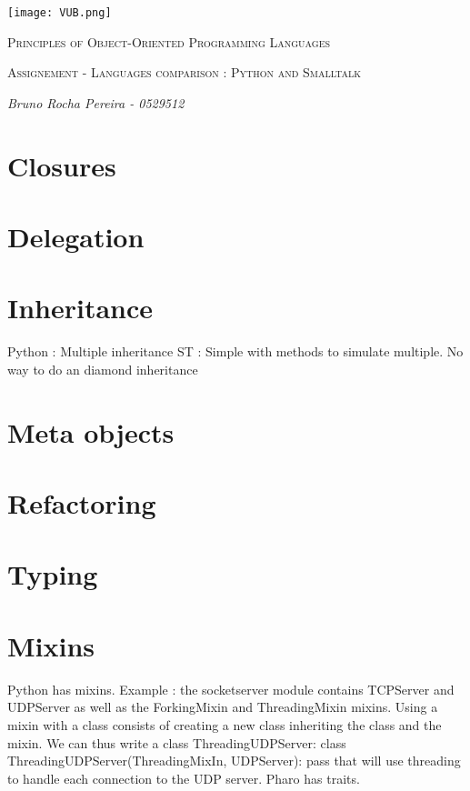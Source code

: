 \documentclass[12pt,a4paper,twocolumn]{scrartcl}
\begin{document}
\begin{titlepage}
    \centering
    \texttt{[image: VUB.png]}\par\vspace{1cm}
    {\scshape\Large Principles of Object-Oriented Programming Languages\par}
    \vspace{1cm}
    {\scshape\Large Assignement - Languages comparison : Python and Smalltalk\par}
    \vspace{1.5cm}
    {\Large\itshape Bruno Rocha Pereira - 0529512\par}
    \vfill
\end{titlepage}

\section{Closures}
\section{Delegation}
\section{Inheritance}
Python : Multiple inheritance
ST : Simple with methods to simulate multiple. No way to do an diamond inheritance
\section{Meta objects}
\section{Refactoring}
\section{Typing}
\section{Mixins}
Python has mixins.
Example : the socketserver module contains TCPServer and UDPServer as well as the ForkingMixin and ThreadingMixin mixins. Using a mixin with a class consists of creating a new class inheriting the class and the mixin. We can thus write a class ThreadingUDPServer:
class ThreadingUDPServer(ThreadingMixIn, UDPServer): pass
that will use threading to handle each connection to the UDP server.
Pharo has traits.
\end{document}
